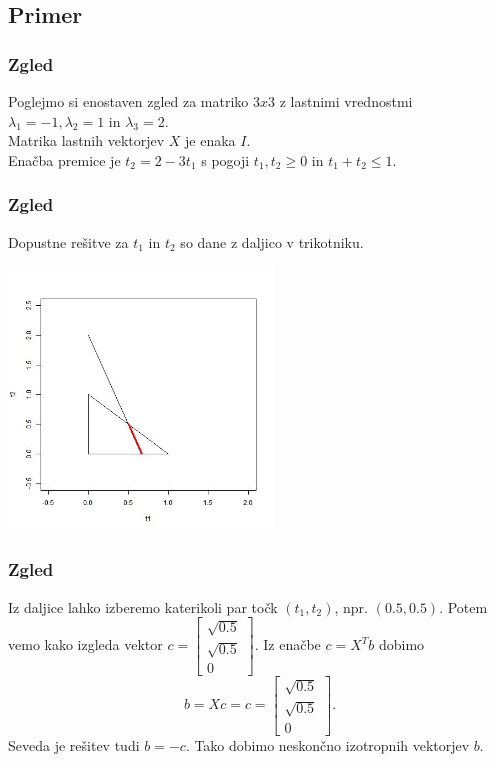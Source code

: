 \documentclass{beamer}
\begin{document}
\subsection{Primer}
\begin{frame}
\frametitle{Zgled}
Poglejmo si enostaven zgled za matriko $3x3$ z lastnimi \medskip vrednostmi $\lambda_1=-1, \lambda_2=1$ in $\lambda_3=2$.\medskip \\ Matrika lastnih vektorjev $X$ je enaka $I$.\medskip \\

Enačba premice je $t_2=2-3t_1$ s pogoji $t_1, t_2 \ge 0$ in $t_1+t_2\le 1$.

\end{frame}
\begin{frame}
\frametitle{Zgled}
Dopustne rešitve za $t_1$ in $t_2$ so dane z daljico v trikotniku.\pause
\begin{center}
\includegraphics[width=7cm]{graf3.jpg}
\end{center}
\end{frame}
\begin{frame}
\frametitle{Zgled}
Iz daljice lahko izberemo katerikoli par točk $(t_1, t_2)$, npr. $(0.5, 0.5)$. Potem vemo kako izgleda vektor 
$c=\begin{bmatrix}
\sqrt{0.5}\\
\sqrt{0.5}\\
0
\end{bmatrix}$. Iz enačbe $c=X^T b$ dobimo 
$$b=Xc=c =\begin{bmatrix}
\sqrt{0.5}\\
\sqrt{0.5}\\
0
\end{bmatrix}.$$
Seveda je rešitev tudi $b=-c$. Tako dobimo neskončno izotropnih vektorjev $b$.
\end{frame}
\end{document}
